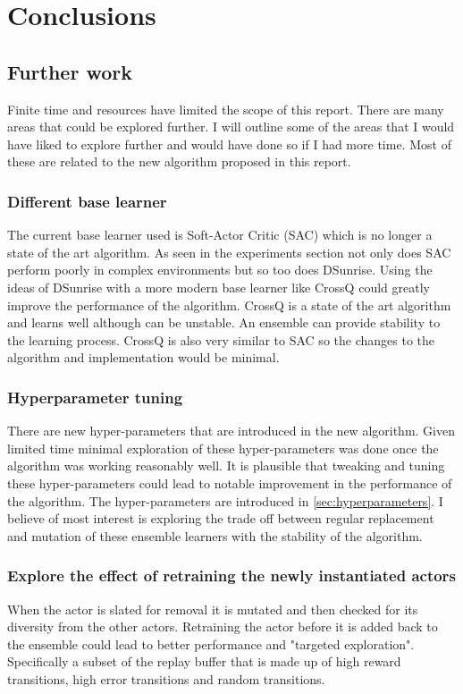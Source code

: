 \chapter{Conclusions}\label{C:con}

\section{Further work}

Finite time and resources have limited the scope of this report. There are many areas that could be explored further. I will outline some of the areas that I would have liked to explore further and would have done so if I had more time. Most of these are related to the new algorithm proposed in this report.

\subsection{Different base learner}
The current base learner used is Soft-Actor Critic (SAC) which is no longer a state of the art algorithm. As seen in the experiments section not only does SAC perform poorly in complex environments but so too does DSunrise. Using the ideas of DSunrise with a more modern base learner like CrossQ could greatly improve the performance of the algorithm. CrossQ is a state of the art algorithm and learns well although can be unstable. An ensemble can provide stability to the learning process. CrossQ is also very similar to SAC so the changes to the algorithm and implementation would be minimal.

\subsection{Hyperparameter tuning}
There are new hyper-parameters that are introduced in the new algorithm. Given limited time minimal exploration of these hyper-parameters was done once the algorithm was working reasonably well. It is plausible that tweaking and tuning these hyper-parameters could lead to notable improvement in the performance of the algorithm. The hyper-parameters are introduced in \ref{sec:hyperparameters}. I believe of most interest is exploring the trade off between regular replacement and mutation of these ensemble learners with the stability of the algorithm.

\subsection{Explore the effect of retraining the newly instantiated actors}
When the actor is slated for removal it is mutated and then checked for its diversity from the other actors. Retraining the actor before it is added back to the ensemble could lead to better performance and "targeted exploration". Specifically a subset of the replay buffer that is made up of high reward transitions, high error transitions and random transitions.


